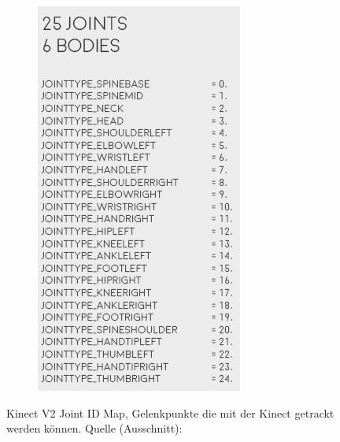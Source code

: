 \begin{figure}[H]
\begin{subfigure}{.38\textwidth}
  \includegraphics[width=\linewidth]{pictures/kinectskeleton-map2-2.png}
  \end{subfigure}
  \caption{\glqq{}Kinect V2 Joint ID Map\grqq{}, Gelenkpunkte die mit der Kinect getrackt werden können. Quelle (Ausschnitt): \cite{tracking2}}
  \label{fig:Bild1}
\end{figure}
